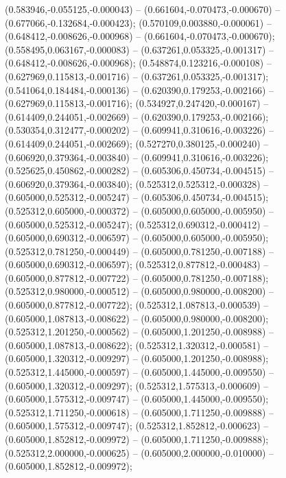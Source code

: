  (0.583946,-0.055125,-0.000043) -- (0.661604,-0.070473,-0.000670) -- (0.677066,-0.132684,-0.000423);
 (0.570109,0.003880,-0.000061) -- (0.648412,-0.008626,-0.000968) -- (0.661604,-0.070473,-0.000670);
 (0.558495,0.063167,-0.000083) -- (0.637261,0.053325,-0.001317) -- (0.648412,-0.008626,-0.000968);
 (0.548874,0.123216,-0.000108) -- (0.627969,0.115813,-0.001716) -- (0.637261,0.053325,-0.001317);
 (0.541064,0.184484,-0.000136) -- (0.620390,0.179253,-0.002166) -- (0.627969,0.115813,-0.001716);
 (0.534927,0.247420,-0.000167) -- (0.614409,0.244051,-0.002669) -- (0.620390,0.179253,-0.002166);
 (0.530354,0.312477,-0.000202) -- (0.609941,0.310616,-0.003226) -- (0.614409,0.244051,-0.002669);
 (0.527270,0.380125,-0.000240) -- (0.606920,0.379364,-0.003840) -- (0.609941,0.310616,-0.003226);
 (0.525625,0.450862,-0.000282) -- (0.605306,0.450734,-0.004515) -- (0.606920,0.379364,-0.003840);
 (0.525312,0.525312,-0.000328) -- (0.605000,0.525312,-0.005247) -- (0.605306,0.450734,-0.004515);
 (0.525312,0.605000,-0.000372) -- (0.605000,0.605000,-0.005950) -- (0.605000,0.525312,-0.005247);
 (0.525312,0.690312,-0.000412) -- (0.605000,0.690312,-0.006597) -- (0.605000,0.605000,-0.005950);
 (0.525312,0.781250,-0.000449) -- (0.605000,0.781250,-0.007188) -- (0.605000,0.690312,-0.006597);
 (0.525312,0.877812,-0.000483) -- (0.605000,0.877812,-0.007722) -- (0.605000,0.781250,-0.007188);
 (0.525312,0.980000,-0.000512) -- (0.605000,0.980000,-0.008200) -- (0.605000,0.877812,-0.007722);
 (0.525312,1.087813,-0.000539) -- (0.605000,1.087813,-0.008622) -- (0.605000,0.980000,-0.008200);
 (0.525312,1.201250,-0.000562) -- (0.605000,1.201250,-0.008988) -- (0.605000,1.087813,-0.008622);
 (0.525312,1.320312,-0.000581) -- (0.605000,1.320312,-0.009297) -- (0.605000,1.201250,-0.008988);
 (0.525312,1.445000,-0.000597) -- (0.605000,1.445000,-0.009550) -- (0.605000,1.320312,-0.009297);
 (0.525312,1.575313,-0.000609) -- (0.605000,1.575312,-0.009747) -- (0.605000,1.445000,-0.009550);
 (0.525312,1.711250,-0.000618) -- (0.605000,1.711250,-0.009888) -- (0.605000,1.575312,-0.009747);
 (0.525312,1.852812,-0.000623) -- (0.605000,1.852812,-0.009972) -- (0.605000,1.711250,-0.009888);
 (0.525312,2.000000,-0.000625) -- (0.605000,2.000000,-0.010000) -- (0.605000,1.852812,-0.009972);
